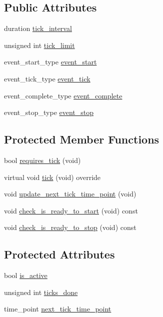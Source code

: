 \subsection*{Public Attributes}
\begin{DoxyCompactItemize}
\item 
duration \hyperlink{classxstd_1_1chrono_1_1timer_a57838b4d220986131fcd8f5ddc1363bc}{tick\-\_\-interval}
\item 
unsigned int \hyperlink{classxstd_1_1chrono_1_1timer_a68ac37affa234daf952955ab2c1d674e}{tick\-\_\-limit}
\item 
event\-\_\-start\-\_\-type \hyperlink{classxstd_1_1chrono_1_1timer_acd6563ae4202b5d67856562d5a024894}{event\-\_\-start}
\item 
event\-\_\-tick\-\_\-type \hyperlink{classxstd_1_1chrono_1_1timer_a7bfca0bacd30aabd2bf7a69e25f2574c}{event\-\_\-tick}
\item 
event\-\_\-complete\-\_\-type \hyperlink{classxstd_1_1chrono_1_1timer_ac12f83ed705997b32c1dcf8853cf93c9}{event\-\_\-complete}
\item 
event\-\_\-stop\-\_\-type \hyperlink{classxstd_1_1chrono_1_1timer_a2f14e4ebe72f6c127f564f2dc4e97909}{event\-\_\-stop}
\end{DoxyCompactItemize}
\subsection*{Protected Member Functions}
\begin{DoxyCompactItemize}
\item 
bool \hyperlink{classxstd_1_1chrono_1_1timer_a79c070e4f1be92f8d8cf0cb62ebe0b2c}{requires\-\_\-tick} (void)
\item 
virtual void \hyperlink{classxstd_1_1chrono_1_1timer_a587e45f1e39ab87de14cda6f39e713da}{tick} (void) override
\item 
void \hyperlink{classxstd_1_1chrono_1_1timer_aef7b4094eebf22027987e81993859488}{update\-\_\-next\-\_\-tick\-\_\-time\-\_\-point} (void)
\item 
void \hyperlink{classxstd_1_1chrono_1_1timer_a6088ae4c5a93946c1159122305d76535}{check\-\_\-is\-\_\-ready\-\_\-to\-\_\-start} (void) const 
\item 
void \hyperlink{classxstd_1_1chrono_1_1timer_a631105f997839a66fb79c7ff87d83532}{check\-\_\-is\-\_\-ready\-\_\-to\-\_\-stop} (void) const 
\end{DoxyCompactItemize}
\subsection*{Protected Attributes}
\begin{DoxyCompactItemize}
\item 
bool \hyperlink{classxstd_1_1chrono_1_1timer_ac6a3c41d433b7e1387c297b925fb26d7}{is\-\_\-active}
\item 
unsigned int \hyperlink{classxstd_1_1chrono_1_1timer_a40ec5c890d4e54669729744b634daa9e}{ticks\-\_\-done}
\item 
time\-\_\-point \hyperlink{classxstd_1_1chrono_1_1timer_a51e85ae6c2a43cef074e5ff3e03620f9}{next\-\_\-tick\-\_\-time\-\_\-point}
\end{DoxyCompactItemize}


